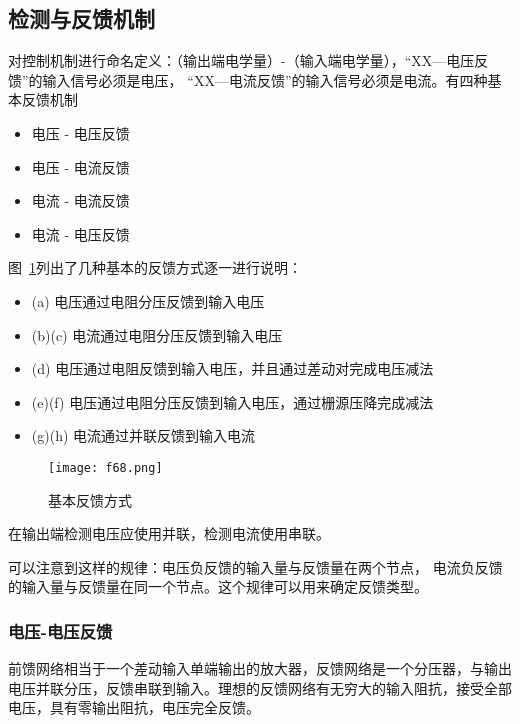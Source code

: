 \documentclass[cn,11pt,chinese,black,simple]{../elegantbook}
\begin{document}


\subsection{检测与反馈机制}

对控制机制进行命名定义：（输出端电学量）-（输入端电学量），“XX—电压反馈”的输入信号必须是电压，
“XX—电流反馈”的输入信号必须是电流。有四种基本反馈机制 
\begin{itemize}
    \item 电压 - 电压反馈
    \item 电压 - 电流反馈
    \item 电流 - 电流反馈
    \item 电流 - 电压反馈
\end{itemize}

图~\ref{fig:ch07:base-feedback}列出了几种基本的反馈方式逐一进行说明：

\begin{itemize}
    \item (a) 电压通过电阻分压反馈到输入电压
    \item (b)(c) 电流通过电阻分压反馈到输入电压
    \item (d) 电压通过电阻反馈到输入电压，并且通过差动对完成电压减法
    \item (e)(f) 电压通过电阻分压反馈到输入电压，通过栅源压降完成减法
    \item (g)(h) 电流通过并联反馈到输入电流
\end{itemize}

\begin{figure}[htb]
    \centering
    \texttt{[image: f68.png]}
    \caption{基本反馈方式}
    \label{fig:ch07:base-feedback}
\end{figure}

在输出端检测电压应使用并联，检测电流使用串联。

可以注意到这样的规律：电压负反馈的输入量与反馈量在两个节点，
电流负反馈的输入量与反馈量在同一个节点。这个规律可以用来确定反馈类型。

\subsubsection{电压-电压反馈}

前馈网络相当于一个差动输入单端输出的放大器，反馈网络是一个分压器，与输出电压并联分压，反馈串联到输入。理想的反馈网络有无穷大的输入阻抗，接受全部电压，具有零输出阻抗，电压完全反馈。
\end{document}
